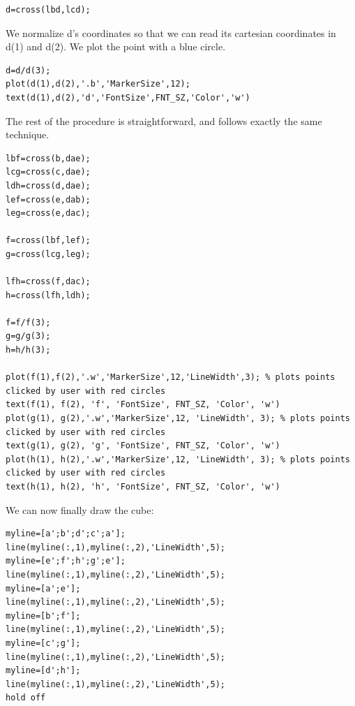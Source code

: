 \documentclass[12pt, a4paper]{report}
\newtheorem[style=M,bodystyle=\normalfont]{theorem}{Theorem}
\newtheorem[style=M,bodystyle=\normalfont]{corollary}{Corollary}
\newtheorem[style=M,bodystyle=\normalfont]{lemma}{Lemma}
\newtheorem[style=M,bodystyle=\normalfont]{definition}{Definition}
\begin{document}
\begin{Answer}[ref=2]
\begin{lstlisting}[frame=single, numbers=none, style=Matlab-bw]
d=cross(lbd,lcd);
        \end{lstlisting}
        We normalize d's coordinates so that we can read its cartesian coordinates in d(1) and d(2). We plot the point with a blue circle.
        \begin{lstlisting}[frame=single, numbers=none, style=Matlab-bw]
d=d/d(3);
plot(d(1),d(2),'.b','MarkerSize',12);
text(d(1),d(2),'d','FontSize',FNT_SZ,'Color','w')
        \end{lstlisting}
        The rest of the procedure is straightforward, and follows exactly the same technique.
        \begin{lstlisting}[frame=single, numbers=none, style=Matlab-bw]
lbf=cross(b,dae);
lcg=cross(c,dae);
ldh=cross(d,dae);
lef=cross(e,dab);
leg=cross(e,dac);

f=cross(lbf,lef);
g=cross(lcg,leg);

lfh=cross(f,dac);
h=cross(lfh,ldh);

f=f/f(3);
g=g/g(3);
h=h/h(3);

plot(f(1),f(2),'.w','MarkerSize',12,'LineWidth',3); % plots points clicked by user with red circles
text(f(1), f(2), 'f', 'FontSize', FNT_SZ, 'Color', 'w')
plot(g(1), g(2),'.w','MarkerSize',12, 'LineWidth', 3); % plots points clicked by user with red circles
text(g(1), g(2), 'g', 'FontSize', FNT_SZ, 'Color', 'w')
plot(h(1), h(2),'.w','MarkerSize',12, 'LineWidth', 3); % plots points clicked by user with red circles
text(h(1), h(2), 'h', 'FontSize', FNT_SZ, 'Color', 'w')
        \end{lstlisting}
        We can now finally draw the cube: 
        \begin{lstlisting}[frame=single, numbers=none, style=Matlab-bw]
myline=[a';b';d';c';a'];
line(myline(:,1),myline(:,2),'LineWidth',5);
myline=[e';f';h';g';e'];
line(myline(:,1),myline(:,2),'LineWidth',5);
myline=[a';e'];
line(myline(:,1),myline(:,2),'LineWidth',5);
myline=[b';f'];
line(myline(:,1),myline(:,2),'LineWidth',5);
myline=[c';g'];
line(myline(:,1),myline(:,2),'LineWidth',5);
myline=[d';h'];
line(myline(:,1),myline(:,2),'LineWidth',5);
hold off
        \end{lstlisting}
    \end{Answer}
\end{document}
